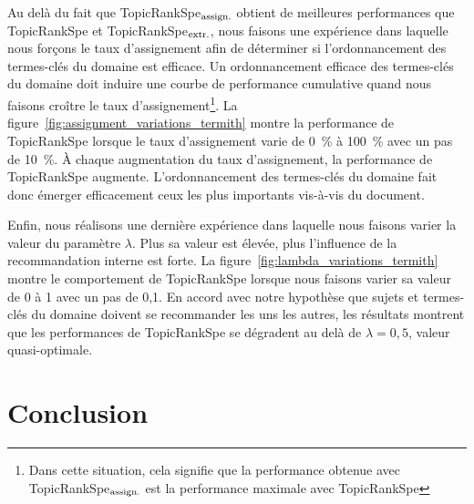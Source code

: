   Au delà du fait que TopicRankSpe$_\textnormal{assign.}$ obtient de
  meilleures performances que TopicRankSpe et
  TopicRankSpe$_\textnormal{extr.}$, nous faisons une expérience dans
  laquelle nous forçons le taux d'assignement afin de déterminer si
  l'ordonnancement des termes-clés du domaine est efficace.
  Un ordonnancement efficace des termes-clés du domaine doit induire une
  courbe de performance cumulative quand nous faisons croître le taux
  d'assignement\footnote{Dans cette situation, cela signifie que la
  performance obtenue avec TopicRankSpe$_\textnormal{assign.}$ est la
  performance maximale avec TopicRankSpe}. La
  figure~\ref{fig:assignment_variations_termith} montre la performance de
  TopicRankSpe lorsque le taux d'assignement varie de 0~\% à 100~\% avec un
  pas de 10~\%. À chaque augmentation du taux d'assignement, la
  performance de TopicRankSpe augmente. L'ordonnancement des termes-clés du
  domaine fait donc émerger efficacement ceux les plus
  importants vis-à-vis du document.
  

  Enfin, nous réalisons une dernière expérience dans laquelle nous faisons
  varier la valeur du paramètre $\lambda$. Plus sa valeur est élevée, plus
  l'influence de la recommandation interne est forte. La
  figure~\ref{fig:lambda_variations_termith} montre le comportement de
  TopicRankSpe lorsque nous faisons varier sa valeur de 0 à 1
  avec un pas de 0,1. En accord avec notre hypothèse que sujets et
  termes-clés du domaine doivent se recommander les uns les autres, les
  résultats montrent que les performances de TopicRankSpe se dégradent au
  delà de $\lambda = 0,5$, valeur quasi-optimale.
  


\section{Conclusion}
\label{sec:main-domain_specific_keyphrase_annotation-conclusion}

